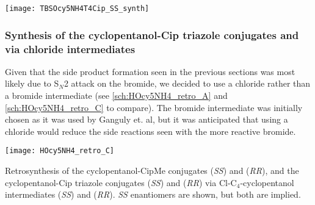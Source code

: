 \begin{scheme}[H]
	\begin{center}
		\texttt{[image: TBSOcy5NH4T4Cip\_SS\_synth]}
		\caption{Synthesis of the (\textit{SS})-TBDMS-cyclopentanol-Cip triazole conjugate .
		a) , sodium ascorbate, THPTA, water, \textit{t}-BuOH, r.t., 87\%. %
		b) TBAF, THF, r.t., 16 h. %
		\label{sch:TBSOcy5NH4T4Cip_SS_synth}}
	\end{center}
\end{scheme}

\subsubsection{Synthesis of the cyclopentanol-Cip triazole conjugates  and  via chloride intermediates\label{sec:Cl4Cl}}

Given that the side product formation seen in the previous sections was most likely due to S$_N$2 attack on the bromide, we decided to use a chloride rather than a bromide intermediate (see \ref{sch:HOcy5NH4_retro_A} and \ref{sch:HOcy5NH4_retro_C} to compare). The bromide intermediate was initially chosen as it was used by Ganguly et. al\cite{Ganguly2011}, but it was anticipated that using a chloride would reduce the side reactions seen with the more reactive bromide.

\begin{scheme}[H]
	\begin{center}
		\texttt{[image: HOcy5NH4\_retro\_C]}
		\caption{Retrosynthesis of the cyclopentanol-CipMe conjugates 
		 (\textit{SS}) and
		 (\textit{RR}), 
		and the cyclopentanol-Cip triazole conjugates 
		 (\textit{SS}) and
		 (\textit{RR})  
		via Cl-C$_4$-cyclopentanol intermediates 
		 (\textit{SS}) and 
		 (\textit{RR}). 
		\textit{SS} enantiomers are shown, but both are implied.
		\label{sch:HOcy5NH4_retro_C}}
	\end{center}
\end{scheme}

